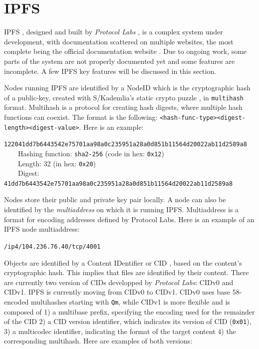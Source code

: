 \documentclass[a4paper,11pt,oneside]{report}
\begin{document}
\section{IPFS}

IPFS \cite{ipfs}, designed and built by \textit{Protocol Labs} \cite{protocollabs}, is a complex system under development, with documentation scattered on multiple websites, the most complete being the official documentation website \cite{docipfs}. Due to ongoing work, some parts of the system are not properly documented yet and some features are incomplete. A few IPFS key features will be discussed in this section.

Nodes running IPFS are identified by a NodeID which is the cryptographic hash of a public-key, created with S/Kademlia’s static crypto puzzle \cite{skad}, in \texttt{multihash} format. Multihash \cite{multihash} is a protocol for creating hash digests, where multiple hash functions can coexist. The format is the following: \texttt{<hash-func-type><digest-length><digest-value>}. Here is an example:

\begin{tcolorbox}
\texttt{122041dd7b6443542e75701aa98a0c235951a28a0d851b11564d20022ab11d2589a8} \\
\-\ \-\ \-\ \-\ Hashing function: \texttt{sha2-256} (code in hex: \texttt{0x12})\\
\-\ \-\ \-\ \-\ Length: 32 (in hex: \texttt{0x20})\\
\-\ \-\ \-\ \-\ Digest: \texttt{41dd7b6443542e75701aa98a0c235951a28a0d851b11564d20022ab11d2589a8}
\end{tcolorbox}

Nodes store their public and private key pair locally. A node can also be identified by the \textit{multiaddress} on which it is running IPFS. Multiaddress \cite{multiaddr} is a format for encoding addresses defined by Protocol Labs. Here is an example of an IPFS node multiaddress:

\texttt{/ip4/104.236.76.40/tcp/4001}

Objects are identified by a Content IDentifier or CID \cite{cid}, based on the content’s cryptographic hash. This implies that files are identified by their content. There are currently two version of CIDs developped by \textit{Protocol Labs}: CIDv0 and CIDv1. IPFS is currently moving from CIDv0 to CIDv1. CIDv0 uses base 58-encoded multihashes starting with \texttt{Qm}, while CIDv1 is more flexible and is composed of 1) a multibase prefix, specifying the encoding used for the remainder of the CID 2) a CID version identifier, which indicates its version of CID (\texttt{0x01}), 3) a multicodec identifier, indicating the format of the target content 4) the corresponding multihash. Here are examples of both versions:
\end{document}
